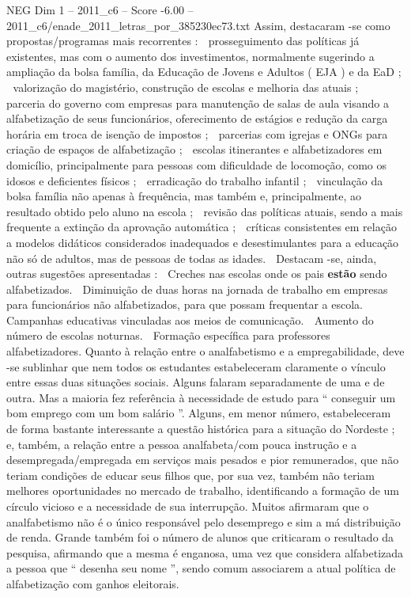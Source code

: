 \begin{textsample}{NEG Dim 1 – 2011\_c6 – Score -6.00 – 2011\_c6/enade\_2011\_letras\_por\_385230ec73.txt}
Assim, destacaram -se como propostas/programas mais recorrentes :  prosseguimento das políticas já existentes, mas com o aumento dos investimentos, normalmente sugerindo a ampliação da bolsa família, da Educação de Jovens e Adultos ( EJA ) e da EaD ;  valorização do magistério, construção de escolas e melhoria das atuais ;  parceria do governo com empresas para manutenção de salas de aula visando a alfabetização de seus funcionários, oferecimento de estágios e redução da carga horária em troca de isenção de impostos ;  parcerias com igrejas e ONGs para criação de espaços de alfabetização ;  escolas itinerantes e alfabetizadores em domicílio, principalmente para pessoas com dificuldade de locomoção, como os idosos e deficientes físicos ;  erradicação do trabalho infantil ;  vinculação da bolsa família não apenas à frequência, mas também e, principalmente, ao resultado obtido pelo aluno na escola ;  revisão das políticas atuais, sendo a mais frequente a extinção da aprovação automática ;  críticas consistentes em relação a modelos didáticos considerados inadequados e desestimulantes para a educação não só de adultos, mas de pessoas de todas as idades.  Destacam -se, ainda, outras sugestões apresentadas :  Creches nas escolas onde os pais \textbf{estão} sendo alfabetizados.  Diminuição de duas horas na jornada de trabalho em empresas para funcionários não alfabetizados, para que possam frequentar a escola.  Campanhas educativas vinculadas aos meios de comunicação.  Aumento do número de escolas noturnas.  Formação específica para professores alfabetizadores.
Quanto à relação entre o analfabetismo e a empregabilidade, deve -se sublinhar que nem todos os estudantes estabeleceram claramente o vínculo entre essas duas situações sociais.
Alguns falaram separadamente de uma e de outra.
Mas a maioria fez referência à necessidade de estudo para “ conseguir um bom emprego com um bom salário ”.
Alguns, em menor número, estabeleceram de forma bastante interessante a questão histórica para a situação do Nordeste ; e, também, a relação entre a pessoa analfabeta/com pouca instrução e a desempregada/empregada em serviços mais pesados e pior remunerados, que não teriam condições de educar seus filhos que, por sua vez, também não teriam melhores oportunidades no mercado de trabalho, identificando a formação de um círculo vicioso e a necessidade de sua interrupção.
Muitos afirmaram que o analfabetismo não é o único responsável pelo desemprego e sim a má distribuição de renda.
Grande também foi o número de alunos que criticaram o resultado da pesquisa, afirmando que a mesma é enganosa, uma vez que considera alfabetizada a pessoa que “ desenha seu nome ”, sendo comum associarem a atual política de alfabetização com ganhos eleitorais.

\end{textsample}
